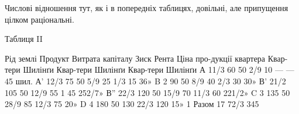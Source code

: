 Числові відношення тут, як і в попередніх таблицях, довільні, але припущення
цілком раціональні.

Таблиця II

Рід  землі    Продукт        Витрата  капіталу    Зиск    Рента    Ціна про-дукції квартера
    Квар-тери    Шилінґи        Квар-тери    Шилінґи    Квар-тери    Шилінґи
А    11/3    60    50    2/9           10 — —           45 шил.
А'    12/3    75    50    5/9           25    1/3          15    36»
B    2         90    50    8/9           40    2/3           30    30»
В'    21/2    105    50    12/9    55    1           45    252/7»
В”    22/3    120    50    15/9    70    11/3    60    221/2»
C     3       135    50    28/9    85    12/3    75    20»
D    4     180    50              130    22/3    120    15» 1
Разом 17                        72/3    345
